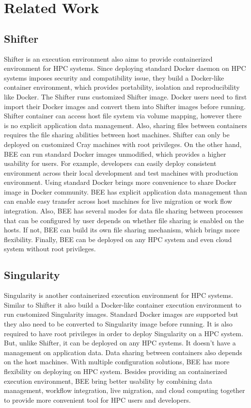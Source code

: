 \section{Related Work}
\label{sec:RelatedWork}
\subsection{Shifter}
Shifter \cite{jacobsen2015contain} is an execution environment also aims to provide containerized environment for HPC systems. Since deploying standard Docker daemon on HPC systems imposes security and compatibility issue, they build a Docker-like container environment, which provides portability, isolation and reproducibility like Docker. The Shifter runs customized Shifter image. Docker users need to first import their Docker images and convert them into Shifter images before running. Shifter container can access host file system via volume mapping, however there is no explicit application data management. Also, sharing files between containers requires the file sharing abilities between host machines. Shifter can only be deployed on customized Cray machines with root privileges. On the other hand, BEE can run standard Docker images unmodified, which provides a higher usability for users. For example, developers can easily deploy consistent environment across their local development and test machines with production environment. Using standard Docker brings more convenience to share Docker image in Docker community. BEE has explicit application data management than can enable easy transfer across host machines for live migration or work flow integration. Also, BEE has several modes for data file sharing between processes that can be configured by user depends on whether file sharing is enabled on the hosts. If not, BEE can build its own file sharing mechanism, which brings more flexibility. Finally, BEE can be deployed on any HPC system and even cloud system without root privileges. 
\subsection{Singularity}
Singularity \cite{kurtzer_2016_60736} is another containerized execution environment for HPC systems. Similar to Shifter it also build a Docker-like container execution environment to run customized Singularity images. Standard Docker images are supported but they also need to be converted to Singularity image before running. It is also required to have root privileges in order to deploy Singularity on a HPC system. But, unlike Shifter, it can be deployed on any HPC systems. It doesn't have a management on application data. Data sharing between containers also depends on the host machines. With multiple configuration solutions, BEE has more flexibility on deploying on HPC system. Besides providing an containerized execution environment, BEE bring better usability by combining data management, workflow integration, live migration, and cloud computing together to provide more convenient tool for HPC users and developers.
